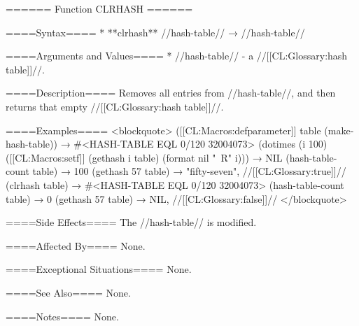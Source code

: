 ====== Function CLRHASH ======

====Syntax====
  * **clrhash** //hash-table// → //hash-table//

====Arguments and Values====
  * //hash-table// - a //[[CL:Glossary:hash table]]//.

====Description====
Removes all entries from //hash-table//, and then returns that empty //[[CL:Glossary:hash table]]//.

====Examples====
<blockquote> ([[CL:Macros:defparameter]] table (make-hash-table)) → #<HASH-TABLE EQL 0/120 32004073> (dotimes (i 100) ([[CL:Macros:setf]] (gethash i table) (format nil "~R" i))) → NIL (hash-table-count table) → 100 (gethash 57 table) → "fifty-seven", //[[CL:Glossary:true]]// (clrhash table) → #<HASH-TABLE EQL 0/120 32004073> (hash-table-count table) → 0 (gethash 57 table) → NIL, //[[CL:Glossary:false]]// </blockquote>

====Side Effects====
The //hash-table// is modified.

====Affected By====
None.

====Exceptional Situations====
None.

====See Also====
None.

====Notes====
None.
